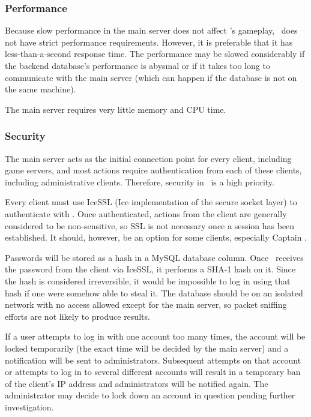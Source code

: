 \subsubsection*{Performance}

Because slow performance in the main server does not affect \VTank's gameplay, \MainServer\ does not have strict performance requirements. However, it is preferable that it has less-than-a-second response time. The performance may be slowed considerably if the backend database's performance is abysmal or if it takes too long to communicate with the main server (which can happen if the database is not on the same machine).

The main server requires very little memory and CPU time.

\subsubsection*{Security}

The main server acts as the initial connection point for every client, including game servers, and most actions require authentication from each of these clients, including administrative clients. Therefore, security in \MainServer\ is a high priority.

Every client must use IceSSL (Ice implementation of the secure socket layer) to authenticate with \MainServer. Once authenticated, actions from the client are generally considered to be non-sensitive, so SSL is not necessary once a session has been established. It should, however, be an option for some clients, especially Captain \VTank.

Passwords will be stored as a hash in a MySQL database column. Once \MainServer\ receives the password from the client via IceSSL, it performs a SHA-1 hash on it. Since the hash is considered irreversible, it would be impossible to log in using that hash if one were somehow able to steal it. The database should be on an isolated network with no access allowed except for the main server, so packet sniffing efforts are not likely to produce results.

If a user attempts to log in with one account too many times, the account will be locked temporarily (the exact time will be decided by the main server) and a notification will be sent to administrators. Subsequent attempts on that account or attempts to log in to several different accounts will result in a temporary ban of the client's IP address and administrators will be notified again. The administrator may decide to lock down an account in question pending further investigation.

